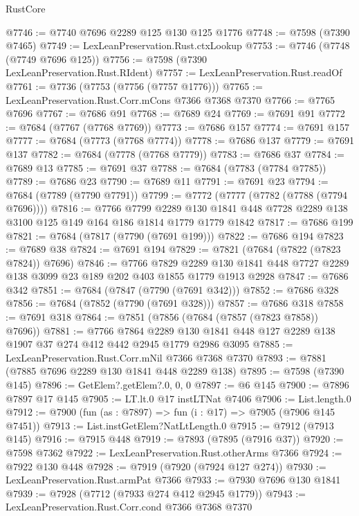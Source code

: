 \begin{lexlean}{RustCore}
\begin{coremodule}
@7746 := @7740 @7696 @2289 @125 @130 @125 @1776
@7748 := @7598 (@7390 @7465)
@7749 := LexLeanPreservation.Rust.ctxLookup
@7753 := @7746 (@7748 (@7749 @7696 @125))
@7756 := @7598 (@7390 LexLeanPreservation.Rust.RIdent)
@7757 := LexLeanPreservation.Rust.readOf
@7761 := @7736 (@7753 (@7756 (@7757 @1776)))
@7765 := LexLeanPreservation.Rust.Corr.mCons @7366 @7368 @7370
@7766 := @7765 @7696
@7767 := @7686 @91
@7768 := @7689 @24
@7769 := @7691 @91
@7772 := @7684 (@7767 (@7768 @7769))
@7773 := @7686 @157
@7774 := @7691 @157
@7777 := @7684 (@7773 (@7768 @7774))
@7778 := @7686 @137
@7779 := @7691 @137
@7782 := @7684 (@7778 (@7768 @7779))
@7783 := @7686 @37
@7784 := @7689 @13
@7785 := @7691 @37
@7788 := @7684 (@7783 (@7784 @7785))
@7789 := @7686 @23
@7790 := @7689 @11
@7791 := @7691 @23
@7794 := @7684 (@7789 (@7790 @7791))
@7799 := @7772 (@7777 (@7782 (@7788 (@7794 @7696))))
@7816 := @7766
    @7799
    @2289
    @130
    @1841
    @448
    @7728
    @2289
    @138
    @3100
    @125
    @149
    @164
    @186
    @1814
    @1779
    @1779
    @1842
@7817 := @7686 @199
@7821 := @7684 (@7817 (@7790 (@7691 @199)))
@7822 := @7686 @194
@7823 := @7689 @38
@7824 := @7691 @194
@7829 := @7821 (@7684 (@7822 (@7823 @7824)) @7696)
@7846 := @7766
    @7829
    @2289
    @130
    @1841
    @448
    @7727
    @2289
    @138
    @3099
    @23
    @189
    @202
    @403
    @1855
    @1779
    @1913
    @2928
@7847 := @7686 @342
@7851 := @7684 (@7847 (@7790 (@7691 @342)))
@7852 := @7686 @328
@7856 := @7684 (@7852 (@7790 (@7691 @328)))
@7857 := @7686 @318
@7858 := @7691 @318
@7864 := @7851 (@7856 (@7684 (@7857 (@7823 @7858)) @7696))
@7881 := @7766
    @7864
    @2289
    @130
    @1841
    @448
    @127
    @2289
    @138
    @1907
    @37
    @274
    @412
    @442
    @2945
    @1779
    @2986
    @3095
@7885 := LexLeanPreservation.Rust.Corr.mNil @7366 @7368 @7370
@7893 := @7881 (@7885 @7696 @2289 @130 @1841 @448 @2289 @138)
@7895 := @7598 (@7390 @145)
@7896 := GetElem?.getElem?.{0, 0, 0}
@7897 := @6 @145
@7900 := @7896 @7897 @17 @145
@7905 := LT.lt.{0} @17 instLTNat @7406
@7906 := List.length.{0}
@7912 := @7900 (fun (as : @7897) => fun (i : @17) => @7905 (@7906 @145 @7451))
@7913 := List.instGetElem?NatLtLength.{0}
@7915 := @7912 (@7913 @145)
@7916 := @7915 @448
@7919 := @7893 (@7895 (@7916 @37))
@7920 := @7598 @7362
@7922 := LexLeanPreservation.Rust.otherArms @7366
@7924 := @7922 @130 @448
@7928 := @7919 (@7920 (@7924 @127 @274))
@7930 := LexLeanPreservation.Rust.armPat @7366
@7933 := @7930 @7696 @130 @1841
@7939 := @7928 (@7712 (@7933 @274 @412 @2945 @1779))
@7943 := LexLeanPreservation.Rust.Corr.cond @7366 @7368 @7370

\end{coremodule}
\end{lexlean}
